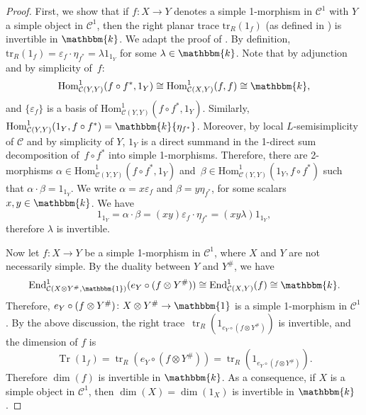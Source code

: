 \documentclass[a4paper, oneside]{amsart}
\numberwithin{equation}{subsection}
\theoremstyle{referencedlemma}
\theoremstyle{plain} %
\theoremstyle{remark}
\begin{document}
\begin{proof}
First, we show that if $f\colon X \to Y$ denotes a simple 1-morphism in $\mathcal{C}^1$ with $Y$ a simple object in $\mathcal{C}^1$, then the right planar trace $\mathrm{tr}_R(1_f)$ (as defined in \cite{douglas_fusion_2018}) is invertible in $\mathbbm{k}$. We adapt the proof of \cite[Lemma~2.3.10]{douglas_fusion_2018}. By definition, $\mathrm{tr}_R(1_f) = \varepsilon_f\cdot \eta_{f^*} = \lambda 1_{1_Y}$ for some $\lambda \in \mathbbm{k}$. Note that by adjunction and by simplicity of~$f$:
$$
\mathrm{Hom}_{\mathcal{C}(Y,Y)}^1(f\circ f^* , 1_Y) \cong \mathrm{Hom}_{\mathcal{C}(X,Y)}^1(f,f) \cong \mathbbm{k},
$$
and $\{\varepsilon_f\}$ is a basis of $\mathrm{Hom}_{\mathcal{C}(Y,Y)}^1(f\circ f^* , 1_Y)$. Similarly,  $\mathrm{Hom}_{\mathcal{C}(Y,Y)}^1( 1_Y, f\circ f^*) = \mathbbm{k}\{\eta_{f^*}\}$. Moreover, by local \mbox{$L$-semi}\-simplicity of $\mathcal{C}$ and by simplicity of $Y$,  $1_Y$ is a direct summand in the 1-direct sum decomposition of~$f\circ f^*$ into simple 1-morphisms.  Therefore, there are 2-morphisms $\alpha \in \mathrm{Hom}_{\mathcal{C}(Y,Y)}^1(f\circ f^* , 1_Y)$ and~$\beta \in \mathrm{Hom}_{\mathcal{C}(Y,Y)}^1(1_Y, f\circ f^*)$ such that $\alpha\cdot \beta = 1_{1_Y}$. We write $\alpha = x\varepsilon_f$ and $\beta = y \eta_{f^*}$, for some scalars $x, y \in \mathbbm{k}$. We have
$$
1_{1_Y} = \alpha\cdot \beta = (xy) \varepsilon_f\cdot \eta_{f^*} = (xy \lambda) 1_{1_Y},
$$
therefore $\lambda$ is invertible.

Now let $f\colon X\to Y$ be a simple 1-morphism in $\mathcal{C}^1$, where $X$ and $Y$ are not necessarily simple.  By the duality between $Y$ and $Y^\#$, we have 
\begin{equation*}
\operatorname{End}_{\mathcal{C}(X\otimes Y^\#, \mathbbm{1})}^1(e_Y\circ (f\otimes Y^\#)) \cong \operatorname{End}_{\mathcal{C}(X,Y)}^1(f) \cong \mathbbm{k}.
\end{equation*}
Therefore,  $e_Y\circ (f\otimes Y^\#) \colon X\otimes Y^\#\to \mathbbm{1}$ is a simple 1-morphism in $\mathcal{C}^1$.  By the above discussion, the right trace~\mbox{$\operatorname{tr}_R(1_{e_Y\circ (f\otimes Y^\#)})$} is invertible, and the dimension of $f$ is 
$$
\operatorname{Tr}(1_f) = \operatorname{tr}_R (e_Y\circ (f\otimes Y^\#)) = \operatorname{tr}_R (1_{e_Y\circ (f\otimes Y^\#)}).
$$
Therefore $\dim(f)$ is invertible in $\mathbbm{k}$. As a consequence, if $X$ is a simple object in $\mathcal{C}^1$, then $\dim(X) = \dim(1_X)$ is invertible in $\mathbbm{k}$. 
\end{proof}
\end{document}
